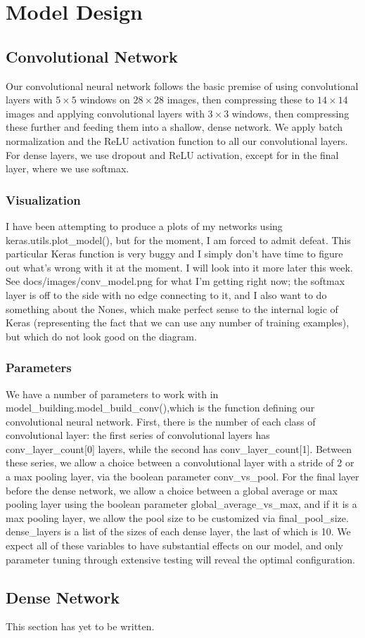\section{Model Design}

\subsection{Convolutional Network}
Our convolutional neural network follows the basic premise of using convolutional layers with $5\times 5$ windows on $28\times 28$ images, then compressing these to $14\times 14$ images and applying convolutional layers with $3\times 3$ windows, then compressing these further and feeding them into a shallow, dense network. We apply batch normalization and the ReLU activation function to all our convolutional layers. For dense layers, we use dropout and ReLU activation, except for in the final layer, where we use softmax.

\subsubsection{Visualization}
I have been attempting to produce a plots of my networks using {\ttfamily keras.utils.plot\_model()}, but for the moment, I am forced to admit defeat. This particular Keras function is very buggy and I simply don't have time to figure out what's wrong with it at the moment. I will look into it more later this week. See {\ttfamily docs/images/conv\_model.png} for what I'm getting right now; the softmax layer is off to the side with no edge connecting to it, and I also want to do something about the {\ttfamily None}s, which make perfect sense to the internal logic of Keras (representing the fact that we can use any number of training examples), but which do not look good on the diagram.

\subsubsection{Parameters} \label{convolutionalparams}
We have a number of parameters to work with in {\ttfamily model\_building.model\_build\_conv()},which is the function defining our convolutional neural network. First, there is the number of each class of convolutional layer: the first series of convolutional layers has {\ttfamily conv\_layer\_count[0]} layers, while the second has {\ttfamily conv\_layer\_count[1]}. Between these series, we allow a choice between a convolutional layer with a stride of 2 or a max pooling layer, via the boolean parameter {\ttfamily conv\_vs\_pool}. For the final layer before the dense network, we allow a choice between a global average or max pooling layer using the boolean parameter {\ttfamily global\_average\_vs\_max}, and if it is a max pooling layer, we allow the pool size to be customized via {\ttfamily final\_pool\_size}. {\ttfamily dense\_layers} is a list of the sizes of each dense layer, the last of which is 10. We expect all of these variables to have substantial effects on our model, and only parameter tuning through extensive testing will reveal the optimal configuration.

\subsection{Dense Network}
This section has yet to be written.